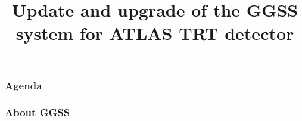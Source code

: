 \documentclass[10pt]{beamer}
\title{Update and upgrade of the GGSS system for ATLAS TRT detector}
\author{\normalsize{Arkadiusz Kasprzak \newline \and Jarosław Cierpich \newline \and Grzegorz Podsiadło \newline \newline \and Supervisor: Bartosz Mindur}}
\begin{document}
\titleframe[en]

\begin{frame}
\frametitle{Agenda}
\tableofcontents
\end{frame}

\begin{frame}
    \frametitle{About GGSS}
\end{frame}
\end{document}

